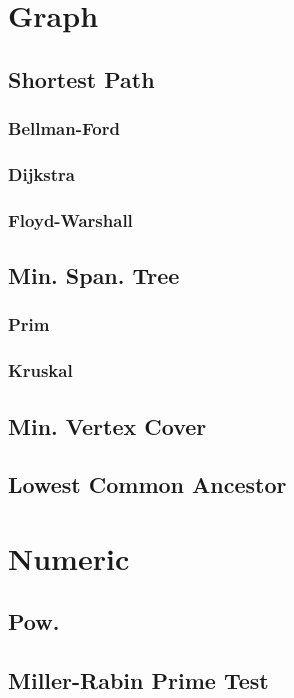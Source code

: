 \documentclass[10pt,a4paper,twocolumn]{extarticle}
\begin{document}
\section{Graph}
    \subsection{Shortest Path}
        \subsubsection{Bellman-Ford}
        \subsubsection{Dijkstra}
			
        \subsubsection{Floyd-Warshall}
    \subsection{Min. Span. Tree}
        \subsubsection{Prim}
        \subsubsection{Kruskal}
	\subsection{Min. Vertex Cover}
    \subsection{Lowest Common Ancestor}

\section{Numeric}
	\subsection{Pow.}
		
	\subsection{Miller-Rabin Prime Test}
		
\end{document}

